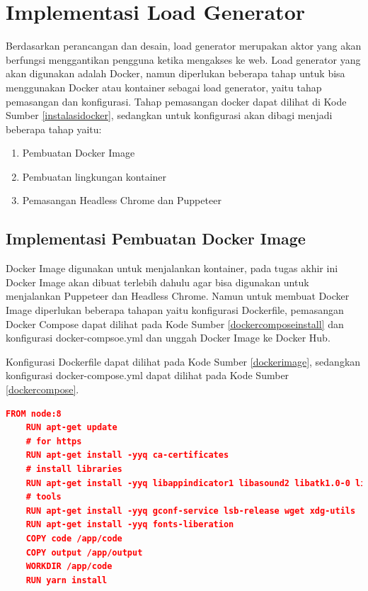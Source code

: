	\section{Implementasi Load Generator}
		Berdasarkan perancangan dan desain, load generator merupakan aktor yang akan berfungsi menggantikan pengguna ketika mengakses ke web. Load generator yang akan digunakan adalah Docker, namun diperlukan beberapa tahap untuk bisa menggunakan Docker atau kontainer sebagai load generator, yaitu tahap pemasangan dan konfigurasi. Tahap pemasangan docker dapat dilihat di Kode Sumber \ref{instalasidocker}, sedangkan untuk konfigurasi akan dibagi menjadi beberapa tahap yaitu:
		\begin{enumerate}
			\item Pembuatan Docker Image
			\item Pembuatan lingkungan kontainer
			\item Pemasangan Headless Chrome dan Puppeteer
		\end{enumerate}
			
		\subsection{Implementasi Pembuatan Docker Image}
			Docker Image digunakan untuk menjalankan kontainer, pada tugas akhir ini Docker Image akan dibuat terlebih dahulu agar bisa digunakan untuk menjalankan Puppeteer dan Headless Chrome. Namun untuk membuat Docker Image diperlukan beberapa tahapan yaitu konfigurasi Dockerfile, pemasangan Docker Compose dapat dilihat pada Kode Sumber \ref{dockercomposeinstall} dan konfigurasi docker-compsoe.yml dan unggah Docker Image ke Docker Hub.
			
			\indent Konfigurasi Dockerfile dapat dilihat pada Kode Sumber \ref{dockerimage}, sedangkan konfigurasi docker-compose.yml dapat dilihat pada Kode Sumber \ref{dockercompose}.
				\begin{lstlisting}[frame=single,tabsize=2,breaklines,caption={Konfigurasi Dockerfile },label=dockerimage, captionpos=b, language=json]
	FROM node:8
	RUN apt-get update
	# for https
	RUN apt-get install -yyq ca-certificates
	# install libraries
	RUN apt-get install -yyq libappindicator1 libasound2 libatk1.0-0 libc6 libcairo2 libcups2 libdbus-1-3 libexpat1 libfontconfig1 libgcc1 libgconf-2-4 libgdk-pixbuf2.0-0 libglib2.0-0 libgtk-3-0 libnspr4 libnss3 libpango-1.0-0 libpangocairo-1.0-0 libstdc++6 libx11-6 libx11-xcb1 libxcb1 libxcomposite1 libxcursor1 libxdamage1 libxext6 libxfixes3 libxi6 libxrandr2 libxrender1 libxss1 libxtst6
	# tools
	RUN apt-get install -yyq gconf-service lsb-release wget xdg-utils
	RUN apt-get install -yyq fonts-liberation 
	COPY code /app/code
	COPY output /app/output
	WORKDIR /app/code
	RUN yarn install
				\end{lstlisting}
				
